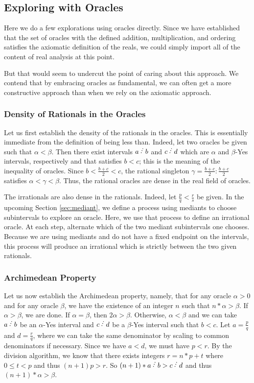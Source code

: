 \documentclass[12pt]{article}
\begin{document}
\subsection{Exploring with Oracles}

Here we do a few explorations using oracles directly. Since we have established that the set of oracles with the defined addition, multiplication, and ordering satisfies the axiomatic definition of the reals, we could simply import all of the content of real analysis at this point. 

But that would seem to undercut the point of caring about this approach. We contend that by embracing oracles as fundamental, we can often get a more constructive approach than when we rely on the axiomatic approach. 

\subsubsection{Density of Rationals in the Oracles}

Let us first establish the density of the rationals in the oracles. This is essentially immediate from the definition of being less than. Indeed, let two oracles be given such that $\alpha < \beta$. Then there exist intervals $a\lte b$ and $c\lte d$ which are $\alpha$ and $\beta$-Yes intervals, respectively and that satisfies $b < c$; this is the meaning of the inequality of oracles. Since $b < \frac{b+c}{2} < c$, the rational singleton $\gamma = \frac{b+c}{2}:\frac{b+c}{2}$ satisfies $\alpha < \gamma < \beta$. Thus, the rational oracles are dense in the real field of oracles. 

The irrationals are also dense in the rationals. Indeed, let $\frac{p}{q} <\frac{r}{s}$ be given. In the upcoming Section \ref{sec:mediant}, we define a process using mediants to choose subintervals to explore an oracle. Here, we use that process to define an irrational oracle. At each step, alternate which of the two mediant subintervals one chooses. Because we are using mediants and do not have a fixed endpoint on the intervals, this process will produce an irrational which is strictly between the two given rationals. 

\subsubsection{Archimedean Property}

Let us now establish the Archimedean property, namely, that for any oracle $\alpha > 0$ and for any oracle $\beta$, we have the existence of an integer $n$ such that $n * \alpha > \beta $. If $\alpha > \beta$, we are done. If $\alpha = \beta$, then $2 \alpha > \beta$. Otherwise, $\alpha < \beta$ and we can take $a\lte b$ be an $\alpha$-Yes interval and $c \lte d$ be a $\beta$-Yes interval such that $b < c$. Let $a = \frac{p}{q}$ and $d = \frac{r}{q}$, where we can take the same denominator by scaling to common denominators if necessary. Since we have $a<d$, we must have $p < r$. By the division algorithm, we know that there exists integers $r = n*p + t$ where $0 \leq  t<p$ and thus $(n+1)p > r$. So $(n+1)*a\lte b > c\lte d$ and thus $(n+1)*\alpha > \beta$.
\end{document}
